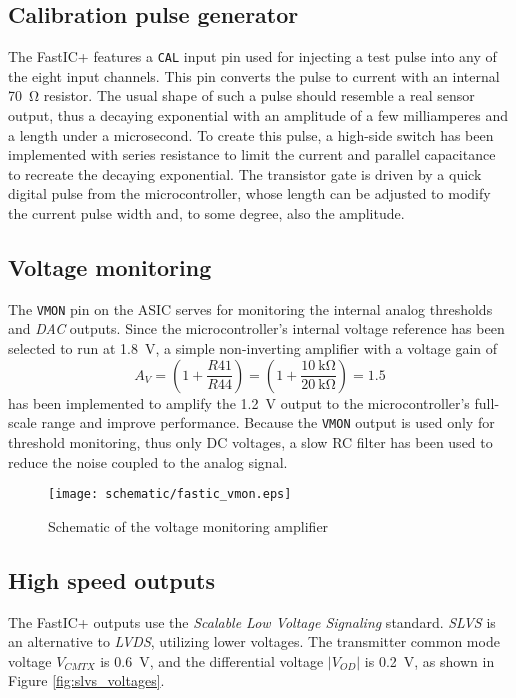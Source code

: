 \subsection{Calibration pulse generator}
The FastIC+ features a \verb|CAL| input pin used for injecting a test pulse into any of the eight input channels. This pin converts the pulse to current with an internal \SI{70}{\ohm} resistor. \cite{ficDatasheet} The usual shape of such a pulse should resemble a real sensor output, thus a decaying exponential with an amplitude of a few milliamperes and a length under a microsecond. To create this pulse, a high-side switch has been implemented with series resistance to limit the current and parallel capacitance to recreate the decaying exponential. The transistor gate is driven by a quick digital pulse from the microcontroller, whose length can be adjusted to modify the current pulse width and, to some degree, also the amplitude.
%
\subsection{Voltage monitoring}
%
The \verb|VMON| pin on the ASIC serves for monitoring the internal analog thresholds and \emph{DAC} outputs. \cite{ficDatasheet} Since the microcontroller's internal voltage reference has been selected to run at \SI{1.8}{\volt}, a simple non-inverting amplifier with a voltage gain of
%
\begin{equation}
    A_V = \left( 1 + \frac{R41}{R44}\right) = \left( 1 + \frac{\SI{10}{\kilo\ohm}}{\SI{20}{\kilo\ohm}}\right) = 1.5
\end{equation}
%
has been implemented to amplify the \SI{1.2}{\volt} output to the microcontroller's full-scale range and improve performance. \cite{an2834_adc_accuracy} Because the \verb|VMON| output is used only for threshold monitoring, thus only DC voltages, a slow RC filter has been used to reduce the noise coupled to the analog signal. \cite{ficDatasheet}
%
\FloatBarrier
\begin{figure}[htp!]
    \centering
    \texttt{[image: schematic/fastic\_vmon.eps]}
    \caption{Schematic of the voltage monitoring amplifier}
    \label{fig:fastic_vmon}
\end{figure}
\FloatBarrier
%
\subsection{High speed outputs}
%
The FastIC+ outputs use the \emph{Scalable Low Voltage Signaling} standard. \emph{SLVS} is an alternative to \emph{LVDS}, utilizing lower voltages. The transmitter common mode voltage $V_{CMTX}$ is \SI{0.6}{\volt}, and the differential voltage $|V_{OD}|$ is \SI{0.2}{\volt}, as shown in Figure \ref{fig:slvs_voltages}. \cite{ficDatasheet}


